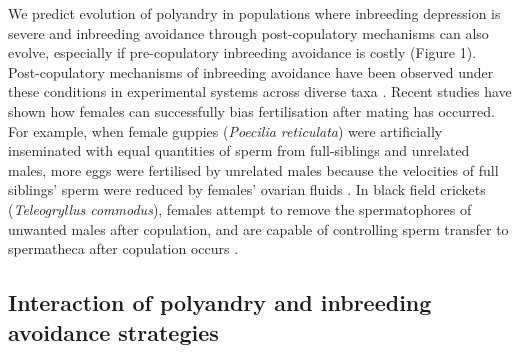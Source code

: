 \documentclass[10pt,letterpaper]{article}
\begin{document}
We predict evolution of polyandry in populations where inbreeding depression is severe and inbreeding avoidance through post-copulatory mechanisms can also evolve, especially if pre-copulatory inbreeding avoidance is costly (Figure 1). Post-copulatory mechanisms of inbreeding avoidance have been observed under these conditions in experimental systems across diverse taxa \cite[e.g.,][]{Pizzari2004, Firman2008, Bretman2009, Gasparini2011, Tuni2013, Firman2015}. Recent studies have shown how females can successfully bias fertilisation after mating has occurred. For example, when female guppies (\textit{Poecilia reticulata}) were artificially inseminated with equal quantities of sperm from full-siblings and unrelated males, more eggs were fertilised by unrelated males because the velocities of full siblings' sperm were reduced by females' ovarian fluids \cite[][]{Gasparini2011}. In black field crickets (\textit{Teleogryllus commodus}), females attempt to remove the spermatophores of unwanted males after copulation, and are capable of controlling sperm transfer to spermatheca after copulation occurs \cite[][]{Bussiere2006, Tuni2013}.

\subsection*{Interaction of polyandry and inbreeding avoidance strategies}
\end{document}
